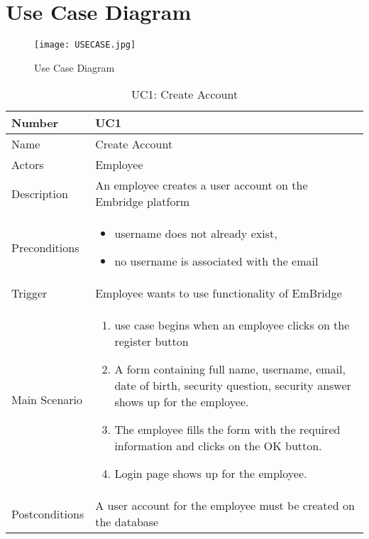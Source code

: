\documentclass[12pt,a4paper]{article}
\begin{document}
\section{Use Case Diagram}
\begin{figure}[h!]
\centering
\texttt{[image: USECASE.jpg]}
\caption{Use Case Diagram}
\label{fig:Use Case Diagram}
\end{figure}

\begin{table}[h]
\centering
\caption{UC1: Create Account}
\label{tab:uc1}
\begin{tabularx}{\textwidth}{@{}lX@{}}
\toprule
Number & UC1 \\ \midrule
Name & Create Account \\
Actors & Employee\\
Description & An employee creates a user account on the Embridge platform \\
Preconditions & 
\begin{itemize}
 \item username does not already exist,
\item no username is associated with the email
\end{itemize} \\
Trigger &  Employee wants to use functionality of EmBridge\\
Main Scenario & 
\begin{enumerate}
\item use case begins when an employee clicks on the register button
\item A form containing full name, username, email, date of birth, security question, security answer shows up for the employee.
 \item The employee fills the form with the required information and clicks on the OK button.
\item Login page shows up for the employee.
 \end{enumerate} \\
Postconditions & A user account for the employee must be created on the database \\
\bottomrule
\end{tabularx}
\end{table}
\end{document}
